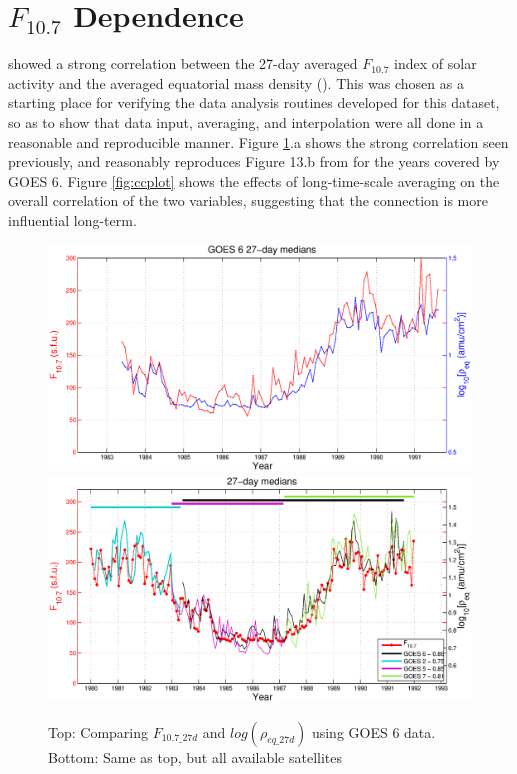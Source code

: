 \section{$F_{10.7}$ Dependence}
\cite{Takahashi2010SolarCycleVariation} showed a strong correlation between the 27-day averaged $F_{10.7}$ index of solar activity and the averaged equatorial mass density (\req). This was chosen as a starting place for verifying the data analysis routines developed for this dataset, so as to show that data input, averaging, and interpolation were all done in a reasonable and reproducible manner. Figure \ref{fig:F107rhoeq27dcomparison}.a shows the strong correlation seen previously, and reasonably reproduces Figure 13.b from \cite{Takahashi2010SolarCycleVariation} for the years covered by GOES 6. Figure \ref{fig:ccplot} shows the effects of long-time-scale averaging on the overall correlation of the two variables, suggesting that the connection is more influential long-term.

\begin{figure}[htp!]
	\centering
	\includegraphics[width=0.85\linewidth]{Figures/F107MD27d-GOES6}
		\includegraphics[width=0.85\linewidth]{Figures/F107MD27d-all}
	\caption{Top: Comparing $F_{10.7\_27d}$ and $log(\rho_{eq\_27d})$ using GOES 6 data. Bottom: Same as top, but all available satellites}
	\label{fig:F107rhoeq27dcomparison}
\end{figure}

